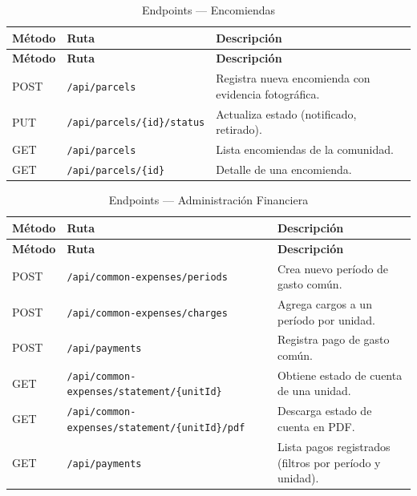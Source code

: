 \begin{longtable}{|p{}|p{}|p{}|}
\caption{Endpoints --- Encomiendas}\label{tab:ep-parcels}\\
\hline
\textbf{Método} & \textbf{Ruta} & \textbf{Descripción} \\
\hline
\endfirsthead
\hline \textbf{Método} & \textbf{Ruta} & \textbf{Descripción} \\ \hline
\endhead
\hline \endfoot

POST & \texttt{/api/parcels} & Registra nueva encomienda con evidencia fotográfica. \\
\hline
PUT & \texttt{/api/parcels/\{id\}/status} & Actualiza estado (notificado, retirado). \\
\hline
GET & \texttt{/api/parcels} & Lista encomiendas de la comunidad. \\
\hline
GET & \texttt{/api/parcels/\{id\}} & Detalle de una encomienda. \\

\end{longtable}

\begin{longtable}{|p{}|p{}|p{}|}
\caption{Endpoints --- Administración Financiera}\label{tab:ep-finance}\\
\hline
\textbf{Método} & \textbf{Ruta} & \textbf{Descripción} \\
\hline
\endfirsthead
\hline \textbf{Método} & \textbf{Ruta} & \textbf{Descripción} \\ \hline
\endhead
\hline \endfoot

POST & \texttt{/api/common-expenses/periods} & Crea nuevo período de gasto común. \\
\hline
POST & \texttt{/api/common-expenses/charges} & Agrega cargos a un período por unidad. \\
\hline
POST & \texttt{/api/payments} & Registra pago de gasto común. \\
\hline
GET & \texttt{/api/common-expenses/statement/\{unitId\}} & Obtiene estado de cuenta de una unidad. \\
\hline
GET & \texttt{/api/common-expenses/statement/\{unitId\}/pdf} & Descarga estado de cuenta en PDF. \\
\hline
GET & \texttt{/api/payments} & Lista pagos registrados (filtros por período y unidad). \\

\end{longtable}

